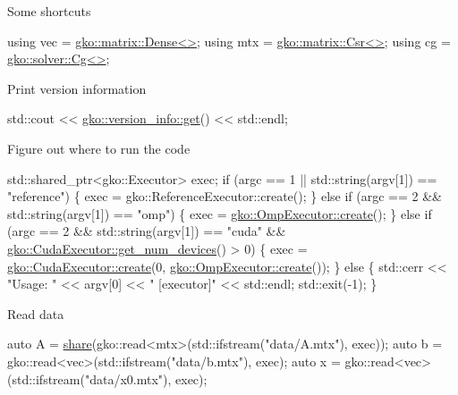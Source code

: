 Some shortcuts


\begin{DoxyCode}
\textcolor{keyword}{using} vec = \hyperlink{classgko_1_1matrix_1_1Dense}{gko::matrix::Dense<>};
\textcolor{keyword}{using} mtx = \hyperlink{classgko_1_1matrix_1_1Csr}{gko::matrix::Csr<>};
\textcolor{keyword}{using} cg = \hyperlink{classgko_1_1solver_1_1Cg}{gko::solver::Cg<>};
\end{DoxyCode}


Print version information


\begin{DoxyCode}
std::cout << \hyperlink{classgko_1_1version__info_a6daeb8a087cfb57fa055526fc133d8eb}{gko::version\_info::get}() << std::endl;
\end{DoxyCode}


Figure out where to run the code


\begin{DoxyCode}
std::shared\_ptr<gko::Executor> exec;
\textcolor{keywordflow}{if} (argc == 1 || std::string(argv[1]) == \textcolor{stringliteral}{"reference"}) \{
    exec = gko::ReferenceExecutor::create();
\} \textcolor{keywordflow}{else} \textcolor{keywordflow}{if} (argc == 2 && std::string(argv[1]) == \textcolor{stringliteral}{"omp"}) \{
    exec = \hyperlink{classgko_1_1OmpExecutor_a33ca05fdd0fc928ee262fc9425304874}{gko::OmpExecutor::create}();
\} \textcolor{keywordflow}{else} \textcolor{keywordflow}{if} (argc == 2 && std::string(argv[1]) == \textcolor{stringliteral}{"cuda"} &&
           \hyperlink{classgko_1_1CudaExecutor_aef0258494d14de0e56149b920c5173e5}{gko::CudaExecutor::get\_num\_devices}() > 0) \{
    exec = \hyperlink{classgko_1_1CudaExecutor_a2718a92034350650ef406ffdb60db090}{gko::CudaExecutor::create}(0, 
      \hyperlink{classgko_1_1OmpExecutor_a33ca05fdd0fc928ee262fc9425304874}{gko::OmpExecutor::create}());
\} \textcolor{keywordflow}{else} \{
    std::cerr << \textcolor{stringliteral}{"Usage: "} << argv[0] << \textcolor{stringliteral}{" [executor]"} << std::endl;
    std::exit(-1);
\}
\end{DoxyCode}


Read data


\begin{DoxyCode}
\textcolor{keyword}{auto} A = \hyperlink{namespacegko_a3ce296f73db0ff398bdea6009a3a5c58}{share}(gko::read<mtx>(std::ifstream(\textcolor{stringliteral}{"data/A.mtx"}), exec));
\textcolor{keyword}{auto} b = gko::read<vec>(std::ifstream(\textcolor{stringliteral}{"data/b.mtx"}), exec);
\textcolor{keyword}{auto} x = gko::read<vec>(std::ifstream(\textcolor{stringliteral}{"data/x0.mtx"}), exec);
\end{DoxyCode}


